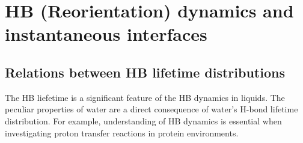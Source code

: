 \chapter{HB (Reorientation) dynamics and instantaneous interfaces}
\section{Relations between HB lifetime distributions}\label{relation_hbd}
The HB liefetime is a significant feature of the HB dynamics in liquids. 
The peculiar properties of water are a direct consequence of water's H-bond lifetime distribution.\cite{Lee2007,Sciortino1989,Sciortino1990prl} 
For example, understanding of HB dynamics is essential when investigating proton transfer reactions in protein environments.\cite{Ishikita2013}  
